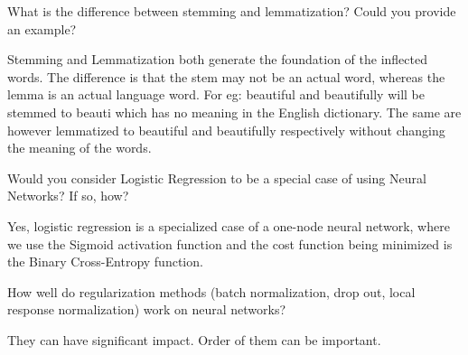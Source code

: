 	\begin{qanda}
		\begin{question}
What is the difference between stemming and lemmatization? Could you provide an example?
		\end{question}
		\begin{answer}
Stemming and Lemmatization both generate the foundation of the inflected words. The difference is that the stem may not be an actual word, whereas the lemma is an actual language word. For eg: beautiful and beautifully will be stemmed to beauti which has no meaning in the English dictionary. The same are however lemmatized to beautiful and beautifully respectively without changing the meaning of the words.
		\end{answer}
	\end{qanda}

	\begin{qanda}
		\begin{question}
Would you consider Logistic Regression to be a special case of using Neural Networks? If so, how?
		\end{question}
		\begin{answer}
Yes, logistic regression is a specialized case of a one-node neural network, where we use the Sigmoid activation function and the cost function being minimized is the Binary Cross-Entropy function.
		\end{answer}
	\end{qanda}


	\begin{qanda}
		\begin{question}
How well do regularization methods (batch normalization, drop out, local response normalization) work on neural networks?
		\end{question}
		\begin{answer}
They can have significant impact.  Order of them can be important.
		\end{answer}
	\end{qanda} 